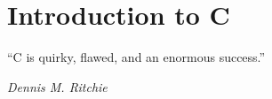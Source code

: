 \chapter{Introduction to C}
\epigraph{``C is quirky, flawed, and an enormous success.''}{\em Dennis M. Ritchie\em}
